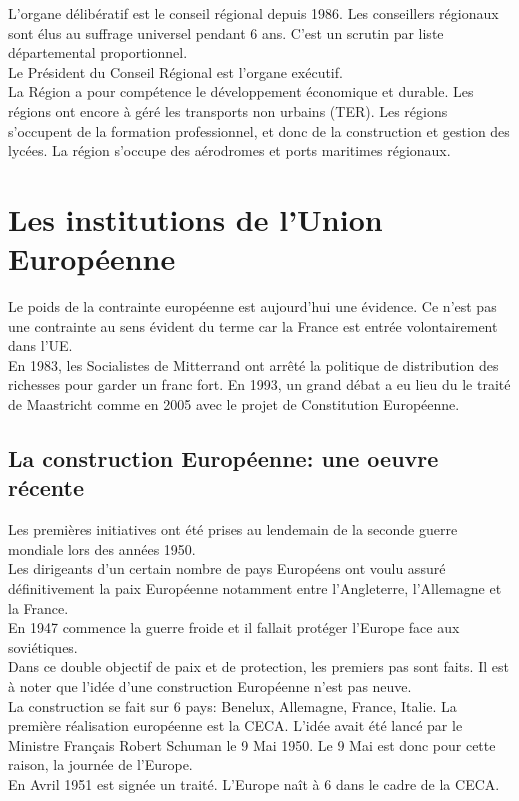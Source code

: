 \documentclass[12pt, a4paper, openany]{book}
\begin{document}
L'organe délibératif est le conseil régional depuis 1986. Les conseillers régionaux sont élus au suffrage universel pendant 6 ans. C'est un scrutin par liste départemental proportionnel. \\
Le Président du Conseil Régional est l'organe exécutif. \\
La Région a pour compétence le développement économique et durable. Les régions ont encore à géré les transports non urbains (TER). Les régions s'occupent de la formation professionnel, et donc de la construction et gestion des lycées. La région s'occupe des aérodromes et ports maritimes régionaux.

\chapter{Les institutions de l'Union Européenne}

Le poids de la contrainte européenne est aujourd'hui une évidence. Ce n'est pas une contrainte au sens évident du terme car la France est entrée volontairement dans l'UE. \\
En 1983, les Socialistes de Mitterrand ont arrêté la politique de distribution des richesses pour garder un franc fort. En 1993, un grand débat a eu lieu du le traité de Maastricht comme en 2005 avec le projet de Constitution Européenne. 

\section{La construction Européenne: une oeuvre récente}

Les premières initiatives ont été prises au lendemain de la seconde guerre mondiale lors des années 1950. \\
Les dirigeants d'un certain nombre de pays Européens ont voulu assuré définitivement la paix Européenne notamment entre l'Angleterre, l'Allemagne et la France. \\
En 1947 commence la guerre froide et il fallait protéger l'Europe face aux soviétiques. \\
Dans ce double objectif de paix et de protection, les premiers pas sont faits. Il est à noter que l'idée d'une construction Européenne n'est pas neuve. \\
La construction se fait sur 6 pays: Benelux, Allemagne, France, Italie. La première réalisation européenne est la CECA. L'idée avait été lancé par le Ministre Français Robert Schuman le 9 Mai 1950. Le 9 Mai est donc pour cette raison, la journée de l'Europe. \\
En Avril 1951 est signée un traité. L'Europe naît à 6 dans le cadre de la CECA.
\end{document}
